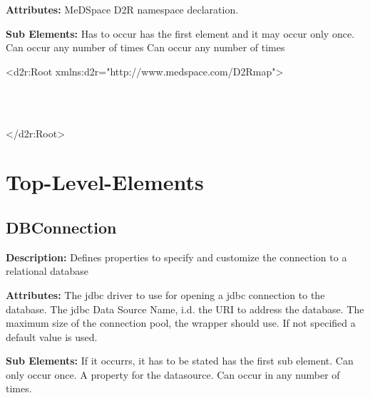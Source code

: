 \textbf{Attributes:} \newline
{}
MeDSpace D2R namespace declaration.
\EndAttribute

\textbf{Sub Elements:} \newline
{}
Has to occur has the first element and it may occur only once. 
\EndAttribute
{}
Can occur any number of times
\EndAttribute
{}
Can occur any number of times
\EndAttribute

\begin{ExampleBox}
	<d2r:Root xmlns:d2r="http://www.medspace.com/D2Rmap">
		\begin{indention}{1cm}
		 \\		
		\\
		
		\end{indention}
	</d2r:Root>
\end{ExampleBox}


\section{Top-Level-Elements}

\subsection{DBConnection}
\textbf{Description:} \newline
Defines properties to specify and customize the connection to a relational database

\textbf{Attributes:} \newline
{}
The jdbc driver to use for opening a jdbc connection to the database.
\EndAttribute
{}
The jdbc Data Source Name, i.d. the URI to address the database.
\EndAttribute
{}
The maximum size of the connection pool, the wrapper should use. If not specified a default value is used.
\EndAttribute

\textbf{Sub Elements:} \newline
{}
If it occurrs, it has to be stated has the first sub element.
Can only occur once.
\EndAttribute
{}
A property for the datasource. Can occur in any number of times.
\EndAttribute

